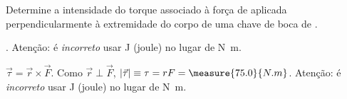 \begin{question}
    Determine a intensidade do torque associado à força de  aplicada perpendicularmente à extremidade do corpo de uma chave de boca de .

    \begin{answer}
      . Atenção: é \emph{incorreto} usar \unit{J} (joule) no lugar de \unit{N.m}.
    \end{answer}
    
    \begin{solution}
      $\vec\tau = \vec r \times \vec F$.
      Como $\vec r \perp \vec F$, $|\vec\tau| \equiv \tau = rF = \measure{75.0}{N.m}$.
      Atenção: é \emph{incorreto} usar \unit{J} (joule) no lugar de \unit{N.m}.
    \end{solution}
\end{question}
